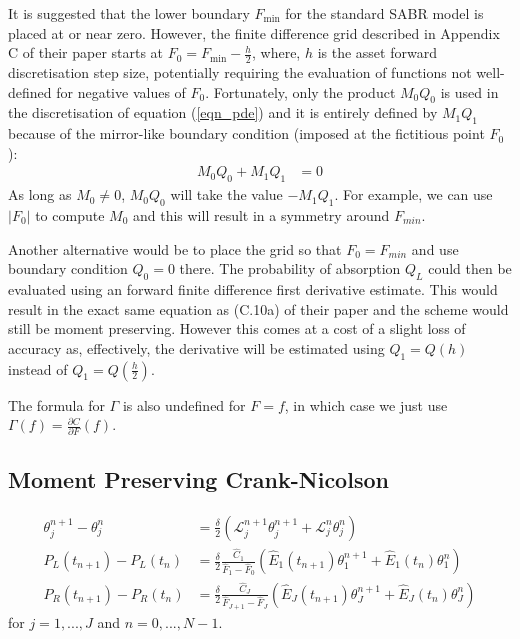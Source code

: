 \documentclass[]{rAMF2e}
\begin{document}
It is suggested that the lower boundary $F_{\min}$ for the standard SABR model is placed at or near zero. However, the finite difference grid described in Appendix C of their paper starts at  $F_0 = F_{\min} - \frac{h}{2}$, where, $h$ is the asset forward discretisation step size, potentially requiring the evaluation of functions not well-defined for negative values of $F_0$. Fortunately, only the product $M_0 Q_0$ is used in the discretisation of equation (\ref{eqn_pde}) and it is entirely defined by $M_1 Q_1$  because of the mirror-like boundary condition (imposed at the fictitious point $F_0$): 
\begin{align}\label{boundary_condition}
M_0 Q_0 + M_1 Q_1 &= 0
\end{align}
As long as $M_0 \neq 0$, $M_0 Q_0$ will take the value $-M_1 Q_1$. For example, we can use $|F_0|$ to compute $M_0$ and this will result in a symmetry around $F_{min}$.


Another alternative would be to place the grid so that $F_0 = F_{min}$ and use boundary condition $Q_0 = 0$ there. The probability of absorption $Q_L$ could then be evaluated using an forward finite difference first derivative estimate. This would result in the exact same equation as (C.10a) of their paper and the scheme would still be moment preserving. However this comes at a cost of a slight loss of accuracy as, effectively, the derivative will be estimated using $Q_1 = Q(h)$ instead of $Q_1 = Q(\frac{h}{2})$.

The formula for $\Gamma$ is also undefined for $F=f$, in which case we just use $\Gamma(f) = \frac{\partial C}{\partial F}(f)$.


\subsection{Moment Preserving Crank-Nicolson}
\begin{subequations}
\begin{align}\label{eqn_cn_1}
\theta_j^{n+1}-\theta_j^n &= \frac{\delta}{2} \left( \mathcal{L}_{j}^{n+1}\theta_j^{n+1} + \mathcal{L}_{j}^{n}\theta_j^{n} \right) \\
P_L (t_{n+1})- P_L (t_{n}) &= \frac{\delta}{2} \frac{\hat{C}_1}{\hat{F}_1-\hat{F}_0}\left(\hat{E}_1(t_{n+1})\theta_1^{n+1}+\hat{E}_1(t_{n})\theta_1^{n} \right)\\
P_R (t_{n+1})-P_R (t_{n}) &=  \frac{\delta}{2} \frac{\hat{C}_J}{\hat{F}_{J+1}-\hat{F}_J}\left(\hat{E}_J(t_{n+1})\theta_J^{n+1}+\hat{E}_J(t_{n})\theta_J^{n} \right)
\end{align}
\end{subequations}
for $j=1,...,J$ and $n=0,...,N-1$.
\end{document}
